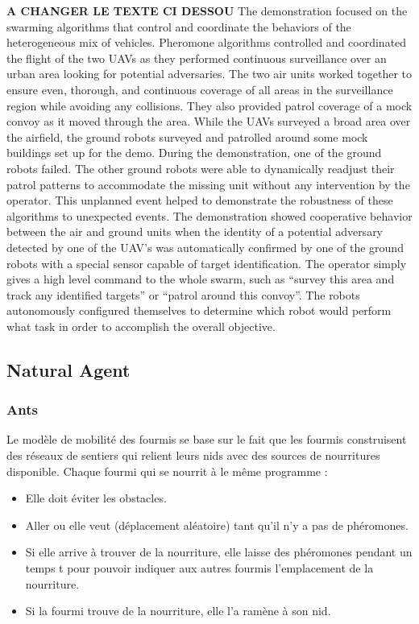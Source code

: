 \textbf{A CHANGER LE TEXTE CI DESSOU}
The demonstration focused on the swarming algorithms that control and coordinate the behaviors of the heterogeneous mix of vehicles.  
Pheromone  algorithms  controlled  and  coordinated  the  flight  of  the  two  UAVs  as  they  performed 
continuous  surveillance  over  an  urban  area  looking  for  potential  adversaries.  The  two  air  units 
worked together to ensure even, thorough, and continuous coverage of all areas in the surveillance 
region  while  avoiding  any  collisions.  They  also  provided  patrol  coverage  of  a  mock  convoy  as  it 
moved through the area. 
While the UAVs surveyed a broad area over the airfield, the ground robots surveyed and patrolled 
around  some  mock  buildings  set  up  for  the  demo.  During  the  demonstration,  one  of  the  ground 
robots  failed.  The  other  ground  robots  were  able  to  dynamically  readjust  their  patrol  patterns to 
accommodate  the  missing  unit  without  any  intervention  by  the  operator.  This  unplanned  event 
helped to demonstrate the robustness of these algorithms to unexpected events. 
The  demonstration  showed  cooperative  behavior  between  the  air  and  ground  units  when  the 
identity of a potential adversary detected by one of the UAV’s was automatically confirmed by one of 
the ground robots with a special sensor capable of target identification. 
The operator simply gives a high level command to the whole swarm, such as “survey this area and 
track  any  identified  targets”  or  “patrol  around  this  convoy”.  The  robots  autonomously  configured 
themselves to determine which robot would perform what task in order to accomplish the overall 
objective.  



\subsection{Natural Agent}

\subsubsection{Ants}

Le modèle de mobilité des fourmis se base sur le fait que les fourmis construisent des réseaux de sentiers qui relient leurs   nids avec des sources de nourritures disponible.
Chaque fourmi qui se nourrit à le même programme :

\begin{itemize}
\item Elle doit éviter les obstacles.
\item Aller ou elle veut (déplacement aléatoire) tant qu'il n'y a pas de phéromones.
\item Si elle arrive à trouver de la nourriture, elle laisse des phéromones pendant un temps t pour pouvoir indiquer aux autres fourmis l'emplacement de la nourriture.
\item Si la fourmi trouve de la nourriture, elle l'a ramène à son nid.
\end{itemize}

